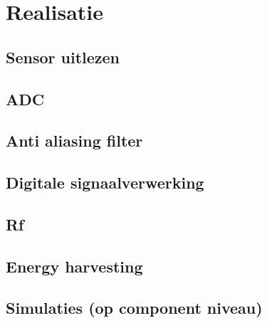 \section{Realisatie}

\subsection{Sensor uitlezen}

\subsection{ADC}

\subsection{Anti aliasing filter}

\subsection{Digitale signaalverwerking}

\subsection{Rf}

\subsection{Energy harvesting}

\subsection{Simulaties (op component niveau)}
